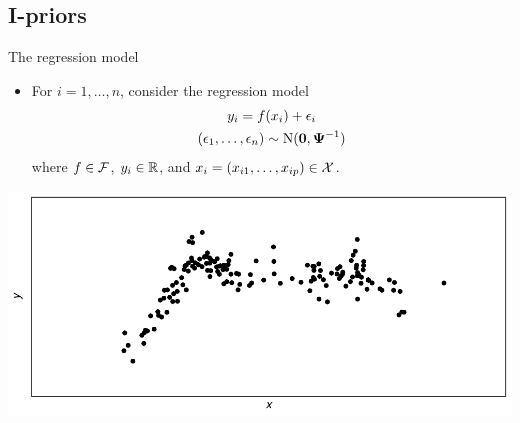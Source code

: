 \subsection{I-priors}

\begin{frame}{The regression model}
  \vspace{-5pt}
  \begin{itemize}\setlength\itemsep{1em}
    \item For $i = 1, \dots, n$, consider the regression model
    \begin{align}
      \begin{gathered}
        y_i = f(x_i) + \epsilon_i \\
        (\epsilon_1, \dots, \epsilon_n) \sim \operatorname{N}({\mathbf 0}, {\bm\Psi}^{-1})
      \end{gathered}
    \end{align}
    where $f \in {\mathcal F}$, $y_i \in \mathbb{R}$, and $x_i = (x_{i1}, \dots, x_{ip}) \in {\mathcal X}$.
  \end{itemize}
  \begin{center}
    \includegraphics[scale=0.7]{figure/points}
  \end{center}
\end{frame}

